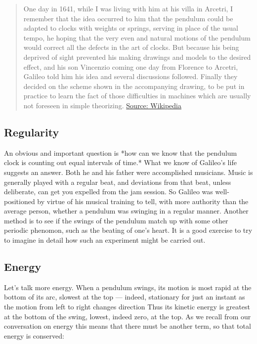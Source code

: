 \begin{quotation}
One day in 1641, while I was living with him at his villa in Arcetri, I remember that the idea occurred to him that the pendulum could be adapted to clocks with weights or springs, serving in place of the usual tempo, he hoping that the very even and natural motions of the pendulum would correct all the defects in the art of clocks. But because his being deprived of sight prevented his making drawings and models to the desired effect, and his son Vincenzio coming one day from Florence to Arcetri, Galileo told him his idea and several discussions followed. Finally they decided on the scheme shown in the accompanying drawing, to be put in practice to learn the fact of those difficulties in machines which are usually not foreseen in simple theorizing.
\href{https://en.wikipedia.org/wiki/Galileo%27s_escapement}{Source: Wikipedia}
\end{quotation}

\subsection{Regularity}

An obvious and important question is *how can we know that the pendulum clock is counting out equal intervals of time.* What we know of Galileo's life suggests an answer.  Both he and his father were accomplished musicians.  Music is generally played with a regular beat, and deviations from that beat, unless deliberate, can get you expelled from the jam session. So Galileo was well-positioned  by virtue of his musical training to tell, with more authority than the average person, whether a pendulum was swinging in a regular manner.  Another method is to see if the swings of the pendulum match up with some other periodic phenomon, such as the beating of one's heart.  It is a good exercise to try to imagine in detail how such an experiment might be carried out.

\subsection{Energy}

Let's talk more energy.  When a pendulum swings, its motion is most rapid at the bottom of its arc, slowest at the top — indeed, stationary for just an instant as the motion from left to right changes direction
Thus its kinetic energy is greatest at the bottom of the swing, lowest, indeed zero, at the top.  As we recall from our conversation on energy this means that there must be another term, so that total energy is conserved:


